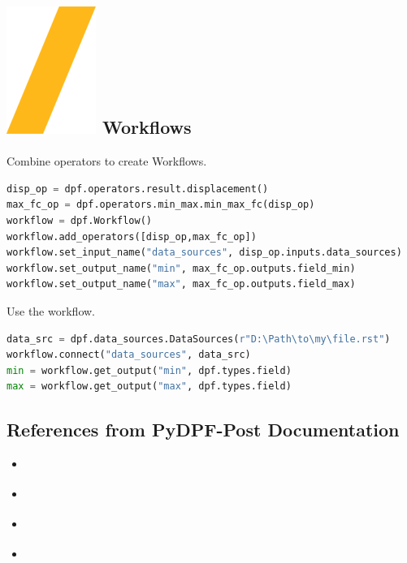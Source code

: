 \documentclass[9pt,landscape]{article}
\begin{document}
\begin{multicols}{3}
\section{\includegraphics[height=\fontcharht\font`\S]{slash.png} Workflows }
Combine operators to create Workflows.
\begin{lstlisting}[language=Python]
disp_op = dpf.operators.result.displacement()
max_fc_op = dpf.operators.min_max.min_max_fc(disp_op)
workflow = dpf.Workflow()
workflow.add_operators([disp_op,max_fc_op])
workflow.set_input_name("data_sources", disp_op.inputs.data_sources)
workflow.set_output_name("min", max_fc_op.outputs.field_min)
workflow.set_output_name("max", max_fc_op.outputs.field_max)
\end{lstlisting}

Use the workflow.
\begin{lstlisting}[language=Python]
data_src = dpf.data_sources.DataSources(r"D:\Path\to\my\file.rst")
workflow.connect("data_sources", data_src)
min = workflow.get_output("min", dpf.types.field)
max = workflow.get_output("max", dpf.types.field)
\end{lstlisting}



\subsection{References from PyDPF-Post Documentation}
\begin{itemize}
\item \href{https://post.docs.pyansys.com/version/stable/getting_started/index.html}{\color{blue}{Getting Started}}
\item \href{https://post.docs.pyansys.com/version/stable/user_guide/index.html}{\color{blue}{User Guide}}
\item \href{https://post.docs.pyansys.com/version/stable/examples/index.html}{\color{blue}{Examples}}
\item \href{https://post.docs.pyansys.com/version/stable/api/index.html}{\color{blue}{API Reference}}
\end{itemize}
\end{multicols}
\end{document}
